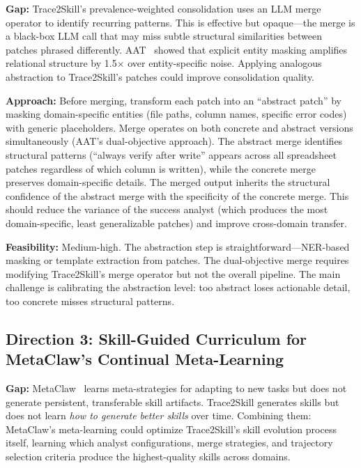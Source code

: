 \documentclass[11pt]{article}
\begin{document}
\textbf{Gap:} Trace2Skill's prevalence-weighted consolidation uses an LLM merge operator to identify recurring patterns. This is effective but opaque---the merge is a black-box LLM call that may miss subtle structural similarities between patches phrased differently. AAT~\cite{aat} showed that explicit entity masking amplifies relational structure by 1.5$\times$ over entity-specific noise. Applying analogous abstraction to Trace2Skill's patches could improve consolidation quality.

\textbf{Approach:} Before merging, transform each patch into an ``abstract patch'' by masking domain-specific entities (file paths, column names, specific error codes) with generic placeholders. Merge operates on both concrete and abstract versions simultaneously (AAT's dual-objective approach). The abstract merge identifies structural patterns (``always verify after write'' appears across all spreadsheet patches regardless of which column is written), while the concrete merge preserves domain-specific details. The merged output inherits the structural confidence of the abstract merge with the specificity of the concrete merge. This should reduce the variance of the success analyst (which produces the most domain-specific, least generalizable patches) and improve cross-domain transfer.

\textbf{Feasibility:} Medium-high. The abstraction step is straightforward---NER-based masking or template extraction from patches. The dual-objective merge requires modifying Trace2Skill's merge operator but not the overall pipeline. The main challenge is calibrating the abstraction level: too abstract loses actionable detail, too concrete misses structural patterns.

\subsection{Direction 3: Skill-Guided Curriculum for MetaClaw's Continual Meta-Learning}

\textbf{Gap:} MetaClaw~\cite{metaclaw} learns meta-strategies for adapting to new tasks but does not generate persistent, transferable skill artifacts. Trace2Skill generates skills but does not learn \textit{how to generate better skills} over time. Combining them: MetaClaw's meta-learning could optimize Trace2Skill's skill evolution process itself, learning which analyst configurations, merge strategies, and trajectory selection criteria produce the highest-quality skills across domains.
\end{document}
